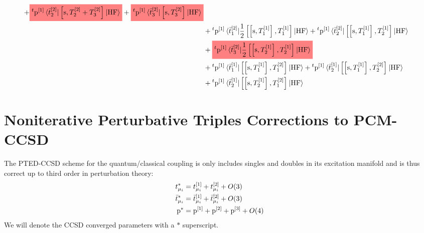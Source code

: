 \begin{equation}
\begin{aligned}
    +
    \highlight{red}{
    {}^t\p^{[1]}
    \braket{\tbar{2}^{[2]} | \commutator{\s}{T_2^{[2]} + T_3^{[2]}} | \mathrm{HF}}
    }
    +
    \highlight{red}{
    {}^t\p^{[1]}
    \braket{\tbar{3}^{[2]} | \commutator{\s}{T_3^{[2]}} | \mathrm{HF}}
    } \\
    &+
    {}^t\p^{[1]}
    \braket{\tbar{1}^{[2]} |
    \frac{1}{2}\commutator{\commutator{\s}{T_1^{[1]}}}{T_1^{[1]}}
    | \mathrm{HF}}
    +
    {}^t\p^{[1]}
    \braket{\tbar{2}^{[2]} |
    \commutator{\commutator{\s}{T_1^{[1]}}}{T_2^{[1]}}
    | \mathrm{HF}} \\
    &+
    \highlight{red}{
    {}^t\p^{[1]}
    \braket{\tbar{3}^{[2]} |
    \frac{1}{2}\commutator{\commutator{\s}{T_2^{[1]}}}{T_2^{[1]}}
    | \mathrm{HF}}
    } \\
    &+ {}^t\p^{[1]}
    \braket{\tbar{1}^{[1]} |
    \commutator{\commutator{\s}{T_1^{[1]}}}{T_1^{[2]}}
    | \mathrm{HF}}
    + {}^t\p^{[1]}
    \braket{\tbar{2}^{[1]} |
    \commutator{\commutator{\s}{T_1^{[1]}}}{T_2^{[2]}}
    | \mathrm{HF}} \\
    &+ {}^t\p^{[1]}
    \braket{\tbar{2}^{[1]} |
    \commutator{\commutator{\s}{T_2^{[1]}}}{T_1^{[2]}}
    | \mathrm{HF}}
  \end{aligned}
\end{equation}

\section[Noniterative Triples Corrections to PCM-CCSD]{
Noniterative Perturbative Triples Corrections to PCM-CCSD}\label{sec:ccsd-t-noniterative}

The \acs{PTED}-\acs{CCSD} scheme for the quantum/classical coupling is
only includes singles and doubles in its excitation manifold and is thus
correct up to third order in perturbation theory:
\begin{subequations}
  \begin{align}
    t_{\mu_i}^{*} &= t_{\mu_i}^{[1]} + t_{\mu_i}^{[2]} + O(3)
    \label{eq:tamp-star} \\
    \bar{t}_{\mu_i}^{*} &= \bar{t}_{\mu_i}^{[1]} + \bar{t}_{\mu_i}^{[2]} + O(3)
    \label{eq:tbar-star} \\
    \mathrm{p}^{*} &= \mathrm{p}^{[1]} + \mathrm{p}^{[2]} + \mathrm{p}^{[3]} + O(4)
    \label{eq:p-star}
  \end{align}
\end{subequations}
We will denote the \acs{CCSD} converged parameters with a $*$ superscript.

